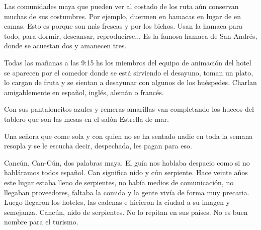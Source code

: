 \documentclass[12pt,twoside,openright,a5paper]{book}
\begin{document}
\vspace{0.5cm}
\hrulefill\hspace{0.2cm} \decofourleft\decofourright \hspace{0.2cm} \hrulefill
\vspace{0.5cm}

Las comunidades maya que pueden ver al costado de los ruta aún conservan
muchas de sus costumbres. Por ejemplo, duermen en hamacas en lugar de en
camas. Esto es porque son más frescas y por los bichos. Usan la hamaca
para todo, para dormir, descansar, reproducirse... Es la famosa hamaca de
San Andrés, donde se acuestan dos y amanecen tres.


\vspace{0.5cm}
\hrulefill\hspace{0.2cm} \decofourleft\decofourright \hspace{0.2cm} \hrulefill
\vspace{0.5cm}

Todas las mañanas a las 9:15 hs los miembros del equipo de animación del
hotel se aparecen por el comedor donde se está sirviendo el desayuno, toman
un plato, lo cargan de fruta y se sientan a desayunar con algunos de los
huéspedes. Charlan amigablemente en español, inglés, alemán o francés.

Con sus pantaloncitos azules y remeras amarillas van completando los huecos
del tablero que son las mesas en el salón Estrella de mar.

Una señora que come sola y con quien no se ha sentado nadie en toda la
semana resopla y se le escucha decir, despechada, les pagan para eso.


\vspace{0.5cm}
\hrulefill\hspace{0.2cm} \decofourleft\decofourright \hspace{0.2cm} \hrulefill
\vspace{0.5cm}

Cancún. Can-Cún, dos palabras maya. El guía nos
hablaba despacio como si no habláramos todos español. Can significa nido
y cún serpiente. Hace veinte años este lugar estaba lleno de serpientes,
no había medios de comunicación, no llegaban proveedores, faltaba la
comida y la gente vivía de forma muy precaria. Luego llegaron los hoteles,
las cadenas e hicieron la ciudad a su imagen y semejanza. Cancún, nido de
serpientes. No lo repitan en sus países. No es buen nombre para el turismo.


\vspace{0.5cm}
\hrulefill\hspace{0.2cm} \decofourleft\decofourright \hspace{0.2cm} \hrulefill
\vspace{0.5cm}
\end{document}
